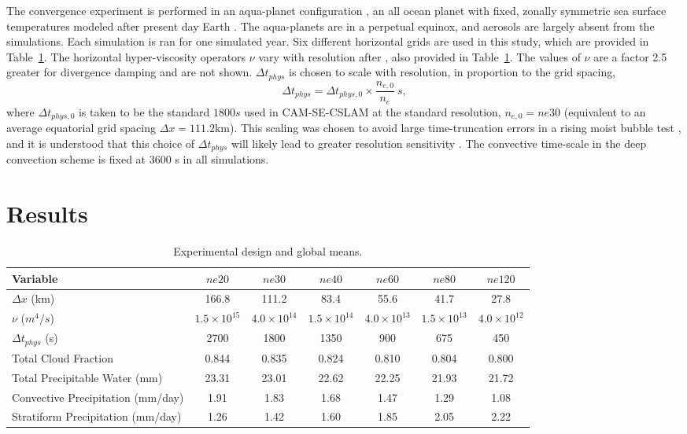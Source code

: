 \documentclass[times]{qjrms4}
\begin{document}
The convergence experiment is performed in an aqua-planet configuration \citep{NH2000ASL,MWO2016JAMES}, an all ocean planet with fixed, zonally symmetric sea surface temperatures modeled after present day Earth \citep[$QOBS$ in][]{NH2000ASL}. The aqua-planets are in a perpetual equinox, and aerosols are largely absent from the simulations. Each simulation is ran for one simulated year. Six different horizontal grids are used in this study, which are provided in Table~\ref{tbl:table1}. The horizontal hyper-viscosity operators $\nu$ vary with resolution after \cite{HETAL2019JAMES}, also provided in Table~\ref{tbl:table1}. The values of $\nu$ are a factor 2.5 greater for divergence damping and are not shown. $\Delta t_{phys}$ is chosen to scale with resolution, in proportion to the grid spacing,
\begin{equation}
\Delta t_{phys} = \Delta t_{phys,0} \times \frac{n_{e,0}}{n_e}~s,\label{eq:dt-scale}
\end{equation}
where $\Delta t_{phys,0}$ is taken to be the standard $1800 s$ used in CAM-SE-CSLAM at the standard resolution, $n_{e,0} = ne30$ (equivalent to an average equatorial grid spacing $\Delta x = 111.2$km). This scaling was chosen to avoid large time-truncation errors in a rising moist bubble test \citep[Appendix A in][]{HETAL2019JAMES}, and it is understood that this choice of $\Delta t_{phys}$ will likely lead to greater resolution sensitivity \citep{W2008TELLUS}. The convective time-scale in the deep convection scheme is fixed at 3600 s in all simulations.
 
\section{Results}

 \begin{table}
 \caption{Experimental design and global means.}
 \centering
 \scriptsize
 \begin{tabular}{lcccccc}
   \hline
   Variable & $ne20$ & $ne30$ & $ne40$ & $ne60$ & $ne80$ & $ne120$ \\ 
   \hline
   $\Delta x$ (km) & 166.8 & 111.2 & 83.4 & 55.6 & 41.7 & 27.8 \\
   $\nu$ ($m^4/s$) & $1.5 \times 10^{15}$ & $4.0 \times 10^{14}$ & $1.5 \times 10^{14}$ & $4.0 \times 10^{13}$  & $1.5 \times 10^{13}$ & $4.0 \times 10^{12}$\\
    $\Delta t_{phys}$ (s) & 2700 & 1800 & 1350 & 900 & 675 & 450 \\
   Total Cloud Fraction & 0.844 & 0.835 & 0.824 & 0.810 & 0.804 & 0.800 \\ 
   Total Precipitable Water (mm) & 23.31& 23.01 & 22.62 & 22.25 & 21.93 & 21.72 \\
   Convective Precipitation (mm/day) & 1.91 & 1.83 & 1.68 & 1.47 & 1.29 & 1.08 \\
   Stratiform Precipitation (mm/day) & 1.26 & 1.42 & 1.60 & 1.85 & 2.05 & 2.22 \\      
 \hline
 \end{tabular}
 \label{tbl:table1}
 \end{table}
\end{document}
